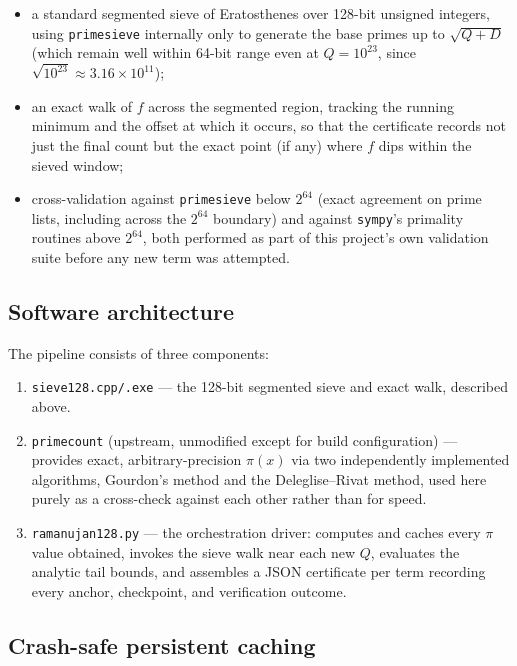\documentclass[11pt]{amsart}
\newcommand{\pcount}{\pi}
\begin{document}
\begin{itemize}
  \item a standard segmented sieve of Eratosthenes over 128-bit unsigned
  integers, using \texttt{primesieve} internally only to generate the
  base primes up to $\sqrt{Q+D}$ (which remain well within 64-bit range
  even at $Q=10^{23}$, since $\sqrt{10^{23}} \approx 3.16\times10^{11}$);
  \item an exact walk of $f$ across the segmented region, tracking the
  running minimum and the offset at which it occurs, so that the
  certificate records not just the final count but the exact point (if
  any) where $f$ dips within the sieved window;
  \item cross-validation against \texttt{primesieve} below $2^{64}$
  (exact agreement on prime lists, including across the $2^{64}$
  boundary) and against \texttt{sympy}'s primality routines above
  $2^{64}$, both performed as part of this project's own validation
  suite before any new term was attempted.
\end{itemize}

\subsection{Software architecture}

The pipeline consists of three components:

\begin{enumerate}
  \item \texttt{sieve128.cpp/.exe} --- the 128-bit segmented sieve and
  exact walk, described above.
  \item \texttt{primecount} (upstream, unmodified except for build
  configuration) --- provides exact, arbitrary-precision $\pcount(x)$ via
  two independently implemented algorithms, Gourdon's method and the
  Deleglise--Rivat method, used here purely as a cross-check against each
  other rather than for speed.
  \item \texttt{ramanujan128.py} --- the orchestration driver: computes
  and caches every $\pcount$ value obtained, invokes the sieve walk near
  each new $Q$, evaluates the analytic tail bounds, and assembles a
  JSON certificate per term recording every anchor, checkpoint, and
  verification outcome.
\end{enumerate}

\subsection{Crash-safe persistent caching}
\end{document}
